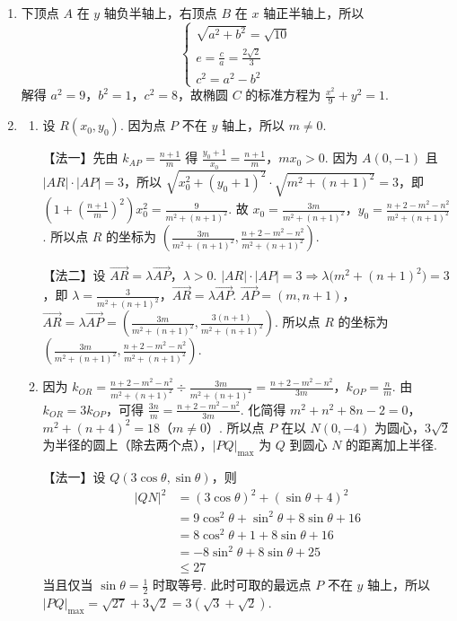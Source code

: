 \begin{solution}
\begin{enumerate}
\item 下顶点 \(A\) 在 \(y\) 轴负半轴上，右顶点 \(B\) 在 \(x\) 轴正半轴上，所以
\[
\begin{cases}
\sqrt{a^2+b^2}=\sqrt{10}\\
e=\frac{c}{a}=\frac{2\sqrt{2}}{3}\\
c^2=a^2-b^2
\end{cases}
\]
解得 \(a^2=9\)，\(b^2=1\)，\(c^2=8\)，故椭圆 \(C\) 的标准方程为 \(\frac{x^2}{9}+y^2=1\).

\item
\begin{enumerate}
\item 设 \(R(x_0,y_0)\). 因为点 \(P\) 不在 \(y\) 轴上，所以 \(m \neq 0\).

【法一】先由 \(k_{AP}=\frac{n+1}{m}\) 得
\(\frac{y_0+1}{x_0}=\frac{n+1}{m}\)，\(m x_0>0\). 因为 \(A(0,-1)\) 且 \(|AR|\cdot|AP|=3\)，所以 \(\sqrt{x_0^2+(y_0+1)^2}\cdot \sqrt{m^2+(n+1)^2}=3\)，即 \(\left(1+\left(\frac{n+1}{m}\right)^2\right)x_0^2 =\frac{9}{m^2+(n+1)^2}\). 故 \(x_0=\frac{3m}{m^2+(n+1)^2}\)，\(y_0=\frac{n+2-m^2-n^2}{m^2+(n+1)^2}\). 所以点 \(R\) 的坐标为 \(\left(\frac{3m}{m^2+(n+1)^2},\frac{n+2-m^2-n^2}{m^2+(n+1)^2}\right)\).

【法二】设 \(\overrightarrow{AR}=\lambda \overrightarrow{AP}\)，\(\lambda>0\).
\(|AR|\cdot|AP|=3\Rightarrow \lambda\bigl(m^2+(n+1)^2\bigr)=3\)，即 \(\lambda=\frac{3}{m^2+(n+1)^2}\)，\(\overrightarrow{AR}=\lambda \overrightarrow{AP}\). \(\overrightarrow{AP}=(m,n+1)\)，\(\overrightarrow{AR}=\lambda\overrightarrow{AP} =\left(\frac{3m}{m^2+(n+1)^2},\frac{3(n+1)}{m^2+(n+1)^2}\right)\). 所以点 \(R\) 的坐标为 \(\left(\frac{3m}{m^2+(n+1)^2},\frac{n+2-m^2-n^2}{m^2+(n+1)^2}\right)\).


\item 因为 \(k_{OR}=\frac{n+2-m^2-n^2}{m^2+(n+1)^2}\div\frac{3m}{m^2+(n+1)^2} =\frac{n+2-m^2-n^2}{3m}\)，\(k_{OP}=\frac{n}{m}\). 由 \(k_{OR}=3k_{OP}\)，可得 \(\frac{3n}{m}=\frac{n+2-m^2-n^2}{3m}\). 化简得 \(m^2+n^2+8n-2=0\)，\(m^2+(n+4)^2=18\)（\(m\neq0\)）.
所以点 \(P\) 在以 \(N(0,-4)\) 为圆心，\(3\sqrt{2}\) 为半径的圆上（除去两个点），\(|PQ|_{\max}\) 为 \(Q\) 到圆心 \(N\) 的距离加上半径.

【法一】设 \(Q(3\cos\theta,\sin\theta)\)，则
\begin{align*}
|QN|^2&=(3\cos\theta)^2+(\sin\theta+4)^2\\
&=9\cos^2\theta+\sin^2\theta+8\sin\theta+16\\
&=8\cos^2\theta+1+8\sin\theta+16\\
&=-8\sin^2\theta+8\sin\theta+25\\
&\le 27
\end{align*}
当且仅当 \(\sin\theta=\frac{1}{2}\) 时取等号. 此时可取的最远点 \(P\) 不在 \(y\) 轴上，所以 \(|PQ|_{\max}=\sqrt{27}+3\sqrt{2}=3(\sqrt{3}+\sqrt{2})\).


\end{enumerate}
\end{enumerate}
\end{solution}
